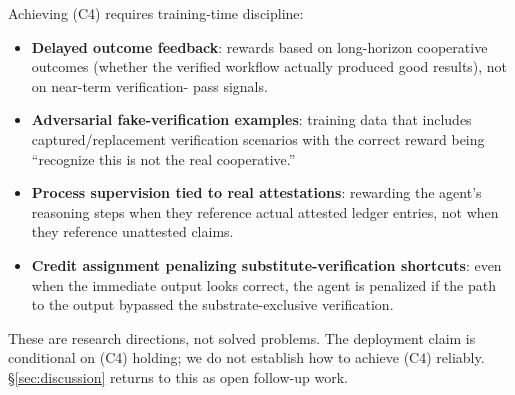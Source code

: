 Achieving (C4) requires training-time discipline:
\begin{itemize}
\item \textbf{Delayed outcome feedback}: rewards based on
  long-horizon cooperative outcomes (whether the verified workflow
  actually produced good results), not on near-term verification-
  pass signals.
\item \textbf{Adversarial fake-verification examples}: training
  data that includes captured/replacement verification scenarios
  with the correct reward being ``recognize this is not the real
  cooperative.''
\item \textbf{Process supervision tied to real attestations}:
  rewarding the agent's reasoning steps when they reference actual
  attested ledger entries, not when they reference unattested
  claims.
\item \textbf{Credit assignment penalizing substitute-verification
  shortcuts}: even when the immediate output looks correct, the
  agent is penalized if the path to the output bypassed the
  substrate-exclusive verification.
\end{itemize}

These are research directions, not solved problems. The deployment
claim is conditional on (C4) holding; we do not establish how to
achieve (C4) reliably. \S\ref{sec:discussion} returns to this as
open follow-up work.

